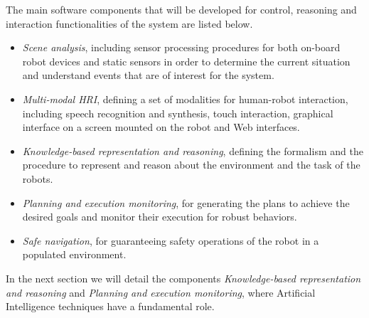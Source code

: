 The main software components that will be developed for control, reasoning and interaction functionalities of the system are listed below.

\begin{itemize}
\item \emph{Scene analysis}, including sensor processing procedures for both on-board robot devices and static sensors in order to determine the current situation and understand events that are of interest for the system.

\item \emph{Multi-modal HRI}, defining a set of modalities for human-robot interaction, including speech recognition and synthesis, touch interaction, graphical interface on a screen mounted on the robot and Web interfaces.

\item \emph{Knowledge-based representation and reasoning}, defining the formalism and the procedure to represent and reason about the environment and the task of the robots.

\item \emph{Planning and execution monitoring}, for generating the plans to achieve the desired goals and monitor their execution for robust behaviors.

\item \emph{Safe navigation}, for guaranteeing safety operations of the robot in a populated environment.

\end{itemize}

In the next section we will detail the components 
\emph{Knowledge-based representation and reasoning} and
\emph{Planning and execution monitoring},
where Artificial Intelligence techniques have a fundamental role.





